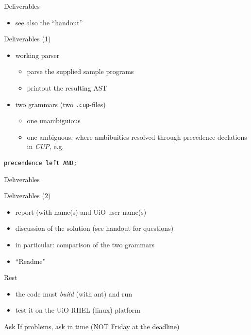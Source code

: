 \documentclass{beamer}
\begin{document}
\begin{frame}[label={sec:org65164d7},fragile]{Deliverables}
 \begin{itemize}
\item see also the ``handout''
\end{itemize}

\begin{block}{Deliverables (1)}
\begin{itemize}
\item working \alert{parser}
\begin{itemize}
\item parse the supplied sample programs
\item printout the resulting AST
\end{itemize}

\item \alert{two} grammars (two \texttt{.cup}-files)

\begin{itemize}
\item one unambiguious
\item one ambiguous, where ambibuities resolved through precedence
declations in \emph{CUP}, e.g.
\end{itemize}
\end{itemize}

\begin{verbatim}
precendence left AND;
\end{verbatim}
\end{block}
\end{frame}


\begin{frame}[label={sec:org52a4e40}]{Deliverables}
\begin{block}{Deliverables (2)}
\begin{itemize}
\item report (with name(s) and UiO user name(s)
\item discussion of the solution (see handout for questions)
\item in particular: comparison of the two grammars
\item ``Readme''
\end{itemize}
\end{block}

\begin{block}{Rest}
\begin{itemize}
\item the code must \emph{build} (with ant) and run
\item test it on the  UiO RHEL (linux) platform
\end{itemize}
\end{block}

\begin{block}{Ask}
If problems, \alert{ask in time}  (\alert{NOT} Friday at the deadline)
\end{block}
\end{frame}
\end{document}
